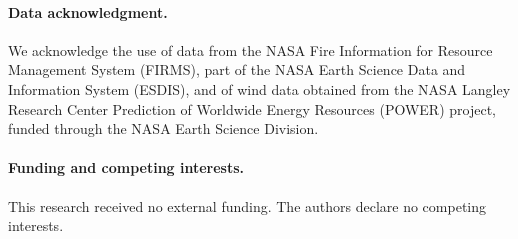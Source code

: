 \documentclass[11pt]{article}
\begin{document}
\paragraph{Data acknowledgment.} We acknowledge the use of data from
the NASA Fire Information for Resource Management System (FIRMS),
part of the NASA Earth Science Data and Information System (ESDIS),
and of wind data obtained from the NASA Langley Research Center
Prediction of Worldwide Energy Resources (POWER) project, funded
through the NASA Earth Science Division.

\paragraph{Funding and competing interests.} This research received
no external funding. The authors declare no competing interests.



\end{document}

